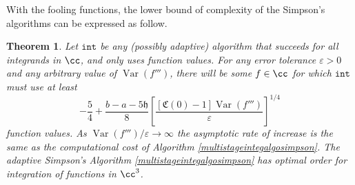 \documentclass{iitthesis}
\DeclareMathOperator{\Var}{Var}
\newtheorem{theorem}{Theorem}
\theoremstyle{definition}
\theoremstyle{remark}
\begin{document}
With the fooling functions, the lower bound of complexity of the Simpson's algorithms can be expressed as follow.
\begin{theorem}\label{compsim}
    Let $\texttt{int}$ be any (possibly adaptive) algorithm that succeeds for all integrands in $\cc$, and only uses function values. For any error tolerance $\varepsilon > 0$ and any arbitrary value of $\Var(f''')$, there will be some $f\in \cc$ for which $\texttt{int}$ must use at least
    \begin{equation}\label{complowbdsim}
        -\frac{5}{4}+\frac{b-a-5\mathfrak{h}}{8}\left[\frac{[\mathfrak{C}(0)-1]\Var( f''')}{\varepsilon}\right]^{1/4}
    \end{equation}
    function values. As $\Var(f''')/\varepsilon \rightarrow \infty$ the asymptotic rate of increase is the same as the computational cost of Algorithm \ref{multistageintegalgosimpson}. The adaptive Simpson's Algorithm \ref{multistageintegalgosimpson} has optimal order for integration of functions in $\cc^3$.
\end{theorem}
\end{document}
